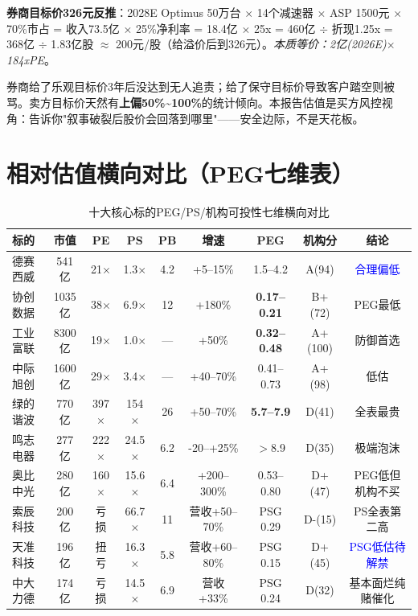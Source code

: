 \textbf{券商目标价326元反推}：2028E Optimus 50万台 $\times$ 14个减速器 $\times$ ASP 1500元 $\times$ 70\%市占 = 收入73.5亿 $\times$ 25\%净利率 = 18.4亿 $\times$ 25x = 460亿 $\div$ 折现1.25x = 368亿 $\div$ 1.83亿股 $\approx$ 200元/股（给溢价后到326元）。\textit{本质等价：2亿(2026E)$\times$184xPE}。

\begin{riskbox}[卖方目标价系统性上偏]
券商给了乐观目标价3年后没达到无人追责；给了保守目标价导致客户踏空则被骂。卖方目标价天然有\textbf{上偏50\%\textasciitilde100\%}的统计倾向。本报告估值是买方风控视角：告诉你"叙事破裂后股价会回落到哪里"——安全边际，不是天花板。
\end{riskbox}

\section{相对估值横向对比（PEG七维表）}

\begin{table}[H]
\centering
\scriptsize
\renewcommand{\arraystretch}{1.1}
\begin{tabularx}{\textwidth}{l c c c c c c c c}
\toprule
\textbf{标的} & \textbf{市值} & \textbf{PE} & \textbf{PS} & \textbf{PB} & \textbf{增速} & \textbf{PEG} & \textbf{机构分} & \textbf{结论} \\
\midrule
德赛西威 & 541亿 & 21$\times$ & 1.3$\times$ & 4.2 & +5--15\% & 1.5--4.2 & A(94) & \textcolor{blue}{合理偏低} \\
协创数据 & 1035亿 & 38$\times$ & 6.9$\times$ & 12 & +180\% & \textbf{0.17--0.21} & B+(72) & \textcolor{riskgreen}{PEG最低} \\
工业富联 & 8300亿 & 19$\times$ & 1.0$\times$ & — & +50\% & \textbf{0.32--0.48} & A+(100) & \textcolor{riskgreen}{防御首选} \\
中际旭创 & 1600亿 & 29$\times$ & 3.4$\times$ & — & +40--70\% & 0.41--0.73 & A+(98) & \textcolor{riskgreen}{低估} \\
绿的谐波 & 770亿 & 397$\times$ & 154$\times$ & 26 & +50--70\% & \textbf{5.7--7.9} & D(41) & \textcolor{riskred}{全表最贵} \\
鸣志电器 & 277亿 & 222$\times$ & 24.5$\times$ & 6.2 & -20--+25\% & $>$8.9 & D(35) & \textcolor{riskred}{极端泡沫} \\
奥比中光 & 280亿 & 160$\times$ & 15.6$\times$ & 6.4 & +200--300\% & 0.53--0.80 & D+(47) & \textcolor{riskamber}{PEG低但机构不买} \\
索辰科技 & 200亿 & 亏损 & 66.7$\times$ & 11 & 营收+50--70\% & PSG 0.29 & D-(15) & \textcolor{riskred}{PS全表第二高} \\
天准科技 & 196亿 & 扭亏 & 16.3$\times$ & 5.8 & 营收+60--80\% & PSG 0.15 & D+(45) & \textcolor{blue}{PSG低估待解禁} \\
中大力德 & 174亿 & 亏损 & 14.5$\times$ & 6.9 & 营收+33\% & PSG 0.24 & D(32) & \textcolor{riskamber}{基本面烂纯赌催化} \\
\bottomrule
\end{tabularx}
\caption{十大核心标的PEG/PS/机构可投性七维横向对比}
\end{table}

